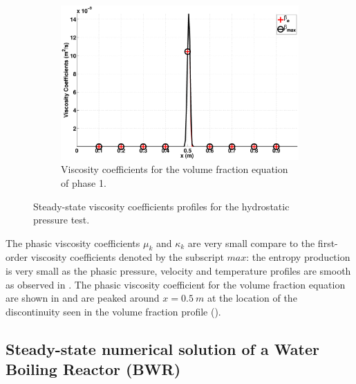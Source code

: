 \documentclass[preprint,10pt]{elsarticle}
\begin{document}
\begin{figure}[H]
        \begin{subfigure}[b]{0.495\textwidth}
                \centering
                \includegraphics[width=\textwidth]{figures/hydrostatic-_liquid_beta.eps}
                \caption{Viscosity coefficients for the volume fraction equation of phase 1.}
                \label{fig:hydrostatic--beta}
        \end{subfigure}        
        \caption{Steady-state viscosity coefficients profiles for the hydrostatic pressure test.}\label{fig:hydrostatic--visc-coeff}
\end{figure}
%
The phasic viscosity coefficients $\mu_k$ and $\kappa_k$ are very small compare to the first-order viscosity coefficients denoted by the subscript $max$: the entropy production is very small as the phasic pressure, velocity and temperature profiles are smooth as observed in . The phasic viscosity coefficient for the volume fraction equation are shown in  and are peaked around $x=0.5 \ m$ at the location of the discontinuity seen in the volume fraction profile ().
%
\subsection{Steady-state numerical solution of a Water Boiling Reactor (BWR)}\label{sec:bwr}
%
\end{document}
